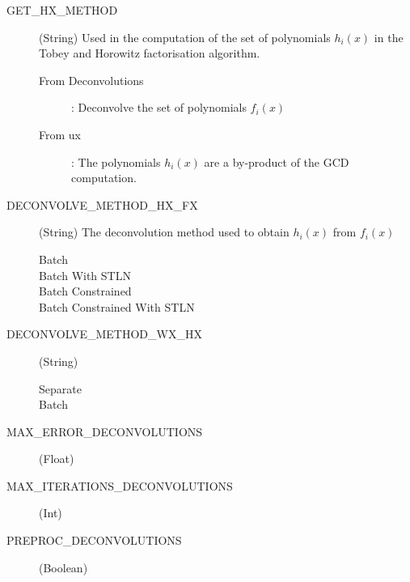 \documentclass{article}
\begin{document}
\begin{description}
	\item[GET\_HX\_METHOD] (String) Used in the computation of the set of polynomials $h_{i}(x)$ in the Tobey and Horowitz factorisation algorithm.
		\begin{description}
		\item[From Deconvolutions] : Deconvolve the set of polynomials $f_{i}(x)$
		\item[From ux] : The polynomials $h_{i}(x)$ are a by-product of the GCD computation. 
		\end{description}
	
	\item[DECONVOLVE\_METHOD\_HX\_FX] (String) 
	The deconvolution method used to obtain $h_{i}(x)$ from $f_{i}(x)$
		\begin{description}
			\item[Batch] 
			\item[Batch With STLN]
			\item[Batch Constrained]
			\item[Batch Constrained With STLN]
		\end{description}
	
	\item[DECONVOLVE\_METHOD\_WX\_HX] (String)
		\begin{description}
			\item[Separate]
			\item[Batch] 
		\end{description}
	
	\item[MAX\_ERROR\_DECONVOLUTIONS] (Float)
	
	\item[MAX\_ITERATIONS\_DECONVOLUTIONS] (Int)
	
	\item[PREPROC\_DECONVOLUTIONS] (Boolean)
	
\end{description}
\end{document}
